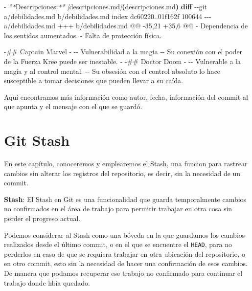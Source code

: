 \documentclass[
]{book}
\newenvironment{Shaded}{\begin{snugshade}}{\end{snugshade}}
\newcommand{\AttributeTok}[1]{\textcolor[rgb]{0.13,0.29,0.53}{#1}}
\newcommand{\ErrorTok}[1]{\textcolor[rgb]{0.64,0.00,0.00}{\textbf{#1}}}
\newcommand{\ExtensionTok}[1]{#1}
\newcommand{\FunctionTok}[1]{\textcolor[rgb]{0.13,0.29,0.53}{\textbf{#1}}}
\newcommand{\KeywordTok}[1]{\textcolor[rgb]{0.13,0.29,0.53}{\textbf{#1}}}
\newcommand{\NormalTok}[1]{#1}
\newcommand{\PreprocessorTok}[1]{\textcolor[rgb]{0.56,0.35,0.01}{\textit{#1}}}
\newcommand{\SpecialStringTok}[1]{\textcolor[rgb]{0.31,0.60,0.02}{#1}}
\begin{document}
\begin{Shaded}
\begin{Highlighting}[]
 \ExtensionTok{{-}} \PreprocessorTok{**}\NormalTok{Descripciones:}\PreprocessorTok{**} \PreprocessorTok{[}\SpecialStringTok{descripciones.md}\PreprocessorTok{]}\ErrorTok{(}\ExtensionTok{descripciones.md}\KeywordTok{)}
\FunctionTok{diff} \AttributeTok{{-}{-}git}\NormalTok{ a/debilidades.md b/debilidades.md}
\ExtensionTok{index}\NormalTok{ dc60220..01f162f 100644}
\ExtensionTok{{-}{-}{-}}\NormalTok{ a/debilidades.md}
\ExtensionTok{+++}\NormalTok{ b/debilidades.md}
\ExtensionTok{@@} \AttributeTok{{-}35,21}\NormalTok{ +35,6 @@}
 \ExtensionTok{{-}}\NormalTok{ Dependencia de los sentidos aumentados.}
 \ExtensionTok{{-}}\NormalTok{ Falta de protección física.}
 
\ExtensionTok{{-}\#\#}\NormalTok{ Captain Marvel}
\ExtensionTok{{-}}
\ExtensionTok{{-}{-}}\NormalTok{ Vulnerabilidad a la magia}
\ExtensionTok{{-}{-}}\NormalTok{ Su conexión con el poder de la Fuerza Kree puede ser inestable.}
\ExtensionTok{{-}}
\ExtensionTok{{-}\#\#}\NormalTok{ Doctor Doom}
\ExtensionTok{{-}}
\ExtensionTok{{-}{-}}\NormalTok{ Vulnerable a la magia y al control mental.}
\ExtensionTok{{-}{-}}\NormalTok{ Su obsesión con el control absoluto lo hace susceptible a tomar decisiones que pueden llevar a su caída.}
\end{Highlighting}
\end{Shaded}

Aquí encontramos más información como autor, fecha, información del commit al que apunta y el mensaje con el que se guardó.

\chapter{Git Stash}\label{git-stash}

En este capítulo, conoceremos y emplearemos el Stash, una funcion para rastrear cambios sin alterar los registros del repositorio, es decir, sin la necesidad de un commit.

\textbf{Stash}: El Stash en Git es una funcionalidad que guarda temporalmente cambios no confirmados en el área de trabajo para permitir trabajar en otra cosa sin perder el progreso actual.

Podemos considerar al Stash como una bóveda en la que guardamos los cambios realizados desde el último commit, o en el que se encuentre el \texttt{HEAD}, para no perderlos en caso de que se requiera trabajar en otra ubicación del repositorio, o en otro commit, esto sin la necesidad de hacer una confirmación de esos cambios. De manera que podamos recuperar ese trabajo no confirmado para continuar el trabajo donde hbía quedado.
\end{document}
